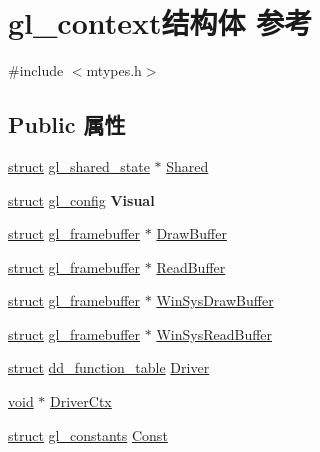 \hypertarget{structgl__context}{}\section{gl\+\_\+context结构体 参考}
\label{structgl__context}


{\ttfamily \#include $<$mtypes.\+h$>$}

\subsection*{Public 属性}
\begin{DoxyCompactItemize}
\item 
\hyperlink{interfacestruct}{struct} \hyperlink{structgl__shared__state}{gl\+\_\+shared\+\_\+state} $\ast$ \hyperlink{structgl__context_a902136f9a479ad001efa6a095eed7ebf}{Shared}
\item 
\mbox{\label{structgl__context_ad4d48636beafc254103c7c4f6e99a374}} 
\hyperlink{interfacestruct}{struct} \hyperlink{structgl__config}{gl\+\_\+config} {\bfseries Visual}
\item 
\hyperlink{interfacestruct}{struct} \hyperlink{structgl__framebuffer}{gl\+\_\+framebuffer} $\ast$ \hyperlink{structgl__context_a69a6afef6a63b78db5e101c8bc0de3c0}{Draw\+Buffer}
\item 
\hyperlink{interfacestruct}{struct} \hyperlink{structgl__framebuffer}{gl\+\_\+framebuffer} $\ast$ \hyperlink{structgl__context_a8708d397970a3e8c2cc77448d018f7c8}{Read\+Buffer}
\item 
\hyperlink{interfacestruct}{struct} \hyperlink{structgl__framebuffer}{gl\+\_\+framebuffer} $\ast$ \hyperlink{structgl__context_ae05433139d6c0d0bf3d0800d49e1f27c}{Win\+Sys\+Draw\+Buffer}
\item 
\hyperlink{interfacestruct}{struct} \hyperlink{structgl__framebuffer}{gl\+\_\+framebuffer} $\ast$ \hyperlink{structgl__context_a899c88a95f3c980b3132e88afb812e42}{Win\+Sys\+Read\+Buffer}
\item 
\hyperlink{interfacestruct}{struct} \hyperlink{structdd__function__table}{dd\+\_\+function\+\_\+table} \hyperlink{structgl__context_ab3a40dffd6176c154014e6ed457da31e}{Driver}
\item 
\hyperlink{interfacevoid}{void} $\ast$ \hyperlink{structgl__context_a8c538dbb407e8bf2f28b4cafad05bdee}{Driver\+Ctx}
\item 
\hyperlink{interfacestruct}{struct} \hyperlink{structgl__constants}{gl\+\_\+constants} \hyperlink{structgl__context_a225ea8c45facc3040c10c9460e031c04}{Const}

\end{DoxyCompactItemize}
